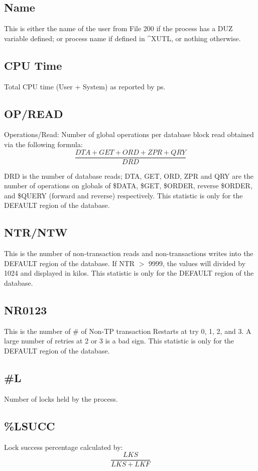 \documentclass[]{article}
\begin{document}
\begin{multicols}{2}
\subsection{Name}
This is either the name of the user from File 200 if the process has a DUZ variable defined; or process name if defined in \^{}XUTL, or nothing otherwise.

\subsection{CPU Time}
Total CPU time (User + System) as reported by ps.

\subsection{OP/READ}
Operations/Read: Number of global operations per database block read obtained via the following formula:  \[\frac{DTA+GET+ORD+ZPR+QRY}{DRD}\]

DRD is the number of database reads; DTA, GET, ORD, ZPR and QRY are the number of operations on globals of \$DATA, \$GET, \$ORDER, reverse \$ORDER, and \$QUERY (forward and reverse) respectively. This statistic is only for the DEFAULT region of the database.

\subsection{NTR/NTW}
This is the number of non-transaction reads and non-transactions writes into the DEFAULT region of the database. If NTR $>$ 9999, the values will divided by 1024 and displayed in kilos. This statistic is only for the DEFAULT region of the database.

\subsection{NR0123}
This is the number of \# of Non-TP transaction Restarts at try 0, 1, 2, and 3. A large number of retries at 2 or 3 is a bad sign. This statistic is only for the DEFAULT region of the database.

\subsection{\#L}
Number of locks held by the process.

\subsection{\%LSUCC}
Lock success percentage calculated by: \[\frac{LKS}{LKS+LKF}\]


\end{multicols}
\end{document}
